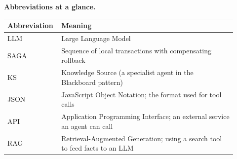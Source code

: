 \documentclass[a4paper,11pt]{article}
\begin{document}
\medskip
\noindent\textbf{Abbreviations at a glance.}
\begin{center}\small
\begin{tabular}{@{}p{0.18\linewidth}p{0.74\linewidth}@{}}
\toprule
\textbf{Abbreviation} & \textbf{Meaning} \\
\midrule
LLM & Large Language Model \\
SAGA & Sequence of local transactions with compensating rollback \\
KS & Knowledge Source (a specialist agent in the Blackboard pattern) \\
JSON & JavaScript Object Notation; the format used for tool calls \\
API & Application Programming Interface; an external service an agent can call \\
RAG & Retrieval-Augmented Generation; using a search tool to feed facts to an LLM \\
\bottomrule
\end{tabular}
\end{center}
\end{document}
